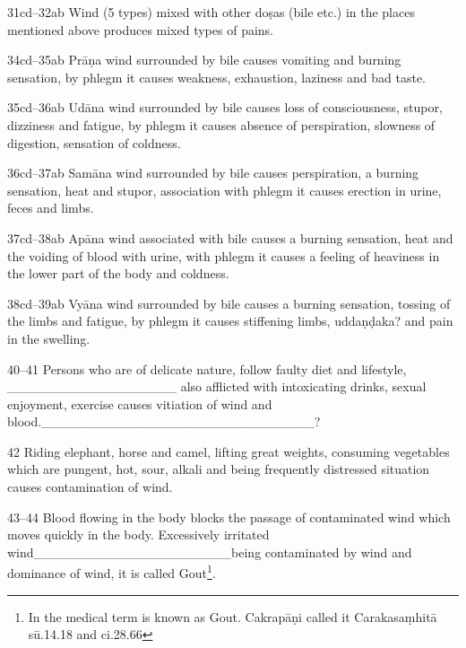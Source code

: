 \begin{translation}
{\item[31cd--32ab] Wind (5 types) mixed with other doṣas (bile etc.) in the places mentioned above produces mixed types of pains.

\item[34cd--35ab] Prāṇa wind surrounded by bile causes vomiting and burning sensation, by phlegm it causes weakness, exhaustion, laziness and bad taste. 

\item[35cd--36ab] Udāna wind surrounded by bile causes loss of consciousness, stupor, dizziness and fatigue, by phlegm it causes absence of perspiration, slowness of digestion, sensation of coldness.

\item[36cd--37ab] Samāna wind surrounded by bile causes perspiration, a burning sensation, heat and stupor, association with phlegm it causes erection in urine, feces and limbs.  

\item[37cd--38ab] Apāna wind associated with bile causes a burning sensation, heat and the voiding of blood with urine, with phlegm it causes a feeling of heaviness in the lower part of the body and coldness.

\item[38cd--39ab] Vyāna wind surrounded by bile causes a burning sensation, tossing of the limbs and fatigue, by phlegm it causes stiffening limbs, uddaṇḍaka? and pain in the swelling.

\item[40--41] Persons who are of delicate nature, follow faulty diet and lifestyle, __________________ also afflicted with intoxicating drinks, 	sexual enjoyment, exercise causes vitiation of wind and blood._____________________________?

\item[42] Riding elephant, horse and camel, lifting great weights, consuming vegetables which are pungent, hot, sour, alkali and being frequently distressed situation causes contamination of wind. 

\item[43--44] Blood flowing in the body blocks the passage of contaminated wind which moves quickly in the body. Excessively irritated wind_____________________being contaminated by wind and dominance of wind, it is called  Gout\footnote{In the medical term  is known as Gout. Cakrapāṇi called it  Carakasaṃhitā sū.14.18 and ci.28.66}.

}
\end{translation}
